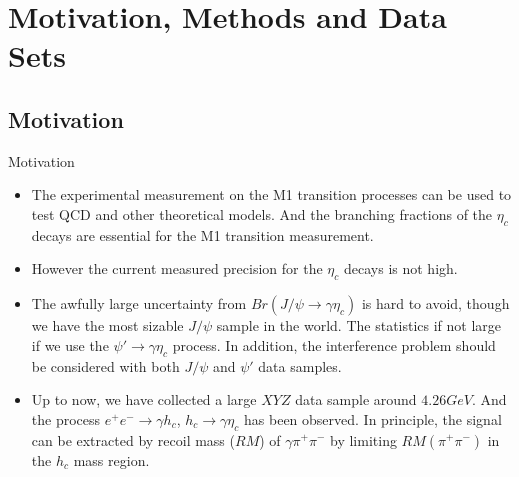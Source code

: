 \documentclass{beamer}
\begin{document}
\section{Motivation, Methods and Data Sets}
\subsection{Motivation}
\begin{frame}{Motivation}
  \begin{block}{}
    \begin{itemize}
        \item The experimental measurement on the M1 transition processes can be used to test QCD and other theoretical models. And the branching fractions of the $\eta_c$ decays are essential for the M1 transition measurement.
        \item However the current measured precision for the $\eta_c$ decays is not high.
    \end{itemize}
  \end{block}
  \begin{block}{}
    \begin{itemize}
        \item The awfully large uncertainty from $Br(J/\psi\to\gamma\eta_c)$ is hard to avoid, though we have the most sizable $J/\psi$ sample in the world. The statistics if not large if we use the $\psi\prime\to\gamma\eta_c$ process. In addition, the interference problem should be considered with both $J/\psi$ and $\psi\prime$ data samples.
        \item Up to now, we have collected a large $XYZ$ data sample around $4.26 GeV$. And the process $e^+e^-\to\gamma h_c$, $h_c\to\gamma\eta_c$ has been observed. In principle, the signal can be extracted by recoil mass ($RM$) of $\gamma\pi^+\pi^-$ by limiting $RM(\pi^+\pi^-)$ in the $h_c$ mass region.
    \end{itemize}
  \end{block}
\end{frame}
\end{document}
